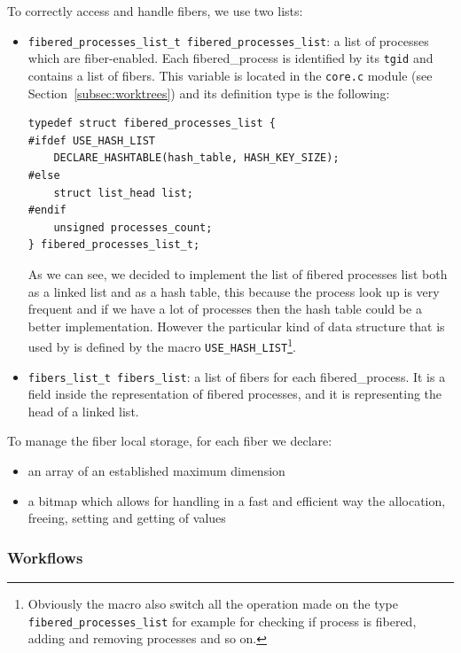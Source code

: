 \documentclass[a4paper,10pt]{article}
\begin{document}
  To correctly access and handle fibers, we use two lists:
  \begin{itemize}
    \item \lstinline{fibered_processes_list_t fibered_processes_list}: a list of processes which are fiber-enabled. Each fibered\_process is identified by its \lstinline{tgid} and contains a list of fibers. This variable is located in the \lstinline{core.c} module (see Section~\ref{subsec:worktrees}) and its definition type is the following:

          \begin{lstlisting}[frame=trBL]
typedef struct fibered_processes_list {
#ifdef USE_HASH_LIST
    DECLARE_HASHTABLE(hash_table, HASH_KEY_SIZE);
#else
    struct list_head list;
#endif
    unsigned processes_count;
} fibered_processes_list_t;
    \end{lstlisting}

          As we can see, we decided to implement the list of fibered processes list both as a linked list and as a hash table, this because the process look up is very frequent and if we have a lot of processes then the hash table could be a better implementation. However the particular kind of data structure that is used by is defined by the macro \lstinline{USE_HASH_LIST}\footnote{Obviously the macro also switch all the operation made on the type \lstinline{fibered_processes_list} for example for checking if process is fibered, adding and removing processes and so on.}.

    \item \lstinline{fibers_list_t fibers_list}: a list of fibers for each fibered\_process. It is a field inside the representation of fibered processes, and it is representing the head of a linked list.
  \end{itemize}

  To manage the fiber local storage, for each fiber we declare:
  \begin{itemize}
    \item an array of an established maximum dimension
    \item a bitmap which allows for handling in a fast and efficient way the allocation, freeing, setting and getting of values
  \end{itemize}

\subsubsection{Workflows}
\end{document}
